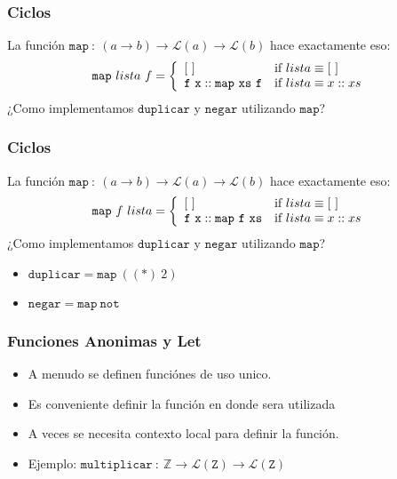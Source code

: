 \documentclass{beamer}
\begin{document}
\begin{frame}
    \frametitle{Ciclos}
    La funci\'on $\mathtt{map}\ :\ (a\rightarrow b) \rightarrow
    \mathcal{L}(a) \rightarrow \mathcal{L}(b)$ hace exactamente eso:
    $$
    \mathtt{map}\ lista\ f=\left\{
        \begin{array}{l l}
            [\ ] & \mbox{if }lista\equiv [\ ] \\
            \mathtt{f\ x::\mathtt{map}\ xs\ f} & \mbox{if }lista\equiv x::xs
        \end{array}
    \right.
    $$
    ¿Como implementamos $\mathtt{duplicar}$ y $\mathtt{negar}$ utilizando $\mathtt{map}$?
\end{frame}

\begin{frame}
    \frametitle{Ciclos}
    La funci\'on $\mathtt{map}\ :\ (a\rightarrow b) \rightarrow
    \mathcal{L}(a) \rightarrow \mathcal{L}(b)$ hace exactamente eso:
    $$
    \mathtt{map}\ f\ lista=\left\{
        \begin{array}{l l}
            [\ ] & \mbox{if }lista\equiv [\ ] \\
            \mathtt{f\ x::\mathtt{map}\ f\ xs} & \mbox{if }lista\equiv x::xs
        \end{array}
    \right.
    $$
    ¿Como implementamos $\mathtt{duplicar}$ y $\mathtt{negar}$ utilizando $\mathtt{map}$?
    \begin{itemize}
        \item{$\mathtt{duplicar}=\mathtt{map}\ ((*)\ 2)$}
        \item{$\mathtt{negar}=\mathtt{map}\ \mathtt{not}$}
    \end{itemize}
\end{frame}

\begin{frame}
\frametitle{Funciones Anonimas y Let}
\begin{itemize}
    \item{A menudo se definen funci\'ones de uso
    unico.}
    \item{Es conveniente definir la funci\'on en
    donde sera utilizada}
    \item{A veces se necesita contexto local para
    definir la funci\'on.}
    \item{Ejemplo: $\mathtt{multiplicar}\ :\ \mathbb{Z}\rightarrow \mathcal{L}(\mathtt{Z})\rightarrow \mathcal{L}(\mathtt{Z})$}
\end{itemize}
\end{frame}
\end{document}
